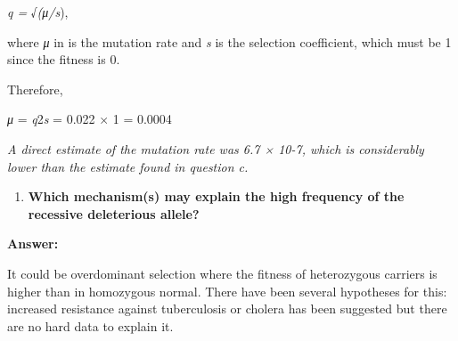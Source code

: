 \documentclass[]{article}
\providecommand{\tightlist}{%
  \setlength{\itemsep}{0pt}\setlength{\parskip}{0pt}}
\begin{document}
\emph{q =} √\emph{(μ/s}),

where \emph{μ} in is the mutation rate and \emph{s} is the selection
coefficient, which must be 1 since the fitness is 0.

Therefore,

\emph{μ} = \emph{q}2\emph{s} = 0.022 × 1 = 0.0004

\emph{A direct estimate of the mutation rate was 6.7 × 10-7, which is
considerably lower than the estimate found in question c.}

\begin{enumerate}
\def\labelenumi{\arabic{enumi})}
\setcounter{enumi}{3}
\tightlist
\item
  \textbf{Which mechanism(s) may explain the high frequency of the
  recessive deleterious allele?}
\end{enumerate}

\textbf{Answer:}

It could be overdominant selection where the fitness of heterozygous
carriers is higher than in homozygous normal. There have been several
hypotheses for this: increased resistance against tuberculosis or
cholera has been suggested but there are no hard data to explain it.
\end{document}
